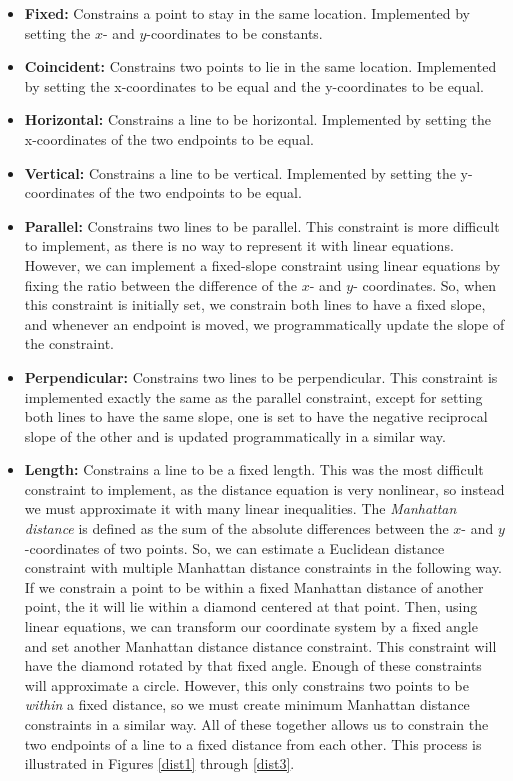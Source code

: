 \begin{itemize}
\item {\bf Fixed:} Constrains a point to stay in the same location. Implemented by setting the $x$- and $y$-coordinates to be constants.
\item {\bf Coincident:} Constrains two points to lie in the same location. Implemented by setting the x-coordinates to be equal and the y-coordinates to be equal.
\item {\bf Horizontal:} Constrains a line to be horizontal. Implemented by setting the x-coordinates of the two endpoints to be equal.
\item {\bf Vertical:} Constrains a line to be vertical. Implemented by setting the y-coordinates of the two endpoints to be equal.
\item {\bf Parallel:} Constrains two lines to be parallel. This constraint is more difficult to implement, as there is no way to represent it with linear equations. However, we can implement a fixed-slope constraint using linear equations by fixing the ratio between the difference of the $x$- and $y$- coordinates. So, when this constraint is initially set, we constrain both lines to have a fixed slope, and whenever an endpoint is moved, we programmatically update the slope of the constraint.
\item {\bf Perpendicular:} Constrains two lines to be perpendicular. This constraint is implemented exactly the same as the parallel constraint, except for setting both lines to have the same slope, one is set to have the negative reciprocal slope of the other and is updated programmatically in a similar way.
\item {\bf Length:} Constrains a line to be a fixed length. This was the most difficult constraint to implement, as the distance equation is very nonlinear, so instead we must approximate it with many linear inequalities. The {\it Manhattan distance} is defined as the sum of the absolute differences between the $x$- and $y$-coordinates of two points. So, we can estimate a Euclidean distance constraint with multiple Manhattan distance constraints in the following way. If we constrain a point to be within a fixed Manhattan distance of another point, the it will lie within a diamond centered at that point. Then, using linear equations, we can transform our coordinate system by a fixed angle and set another Manhattan distance distance constraint. This constraint will have the diamond rotated by that fixed angle. Enough of these constraints will approximate a circle. However, this only constrains two points to be {\it within} a fixed distance, so we must create minimum Manhattan distance constraints in a similar way. All of these together allows us to constrain the two endpoints of a line to a fixed distance from each other. This process is illustrated in Figures \ref{dist1} through \ref{dist3}.
\end{itemize}

